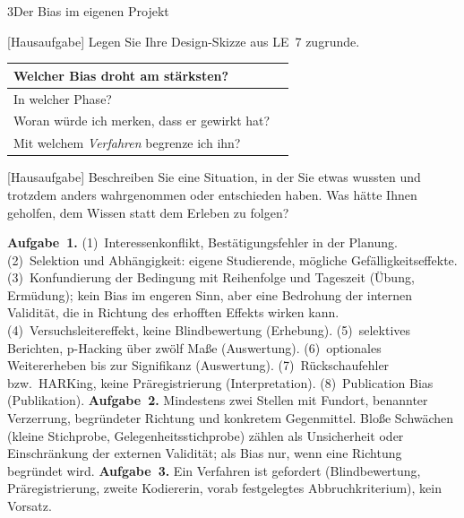 \begin{uebungsblattb}{3}{Der Bias im eigenen Projekt}

[Hausaufgabe]
Legen Sie Ihre Design-Skizze aus LE~7 zugrunde.

\begin{center}
\renewcommand{\arraystretch}{1.8}
\begin{tabular}{|p{}|p{}|}
\hline
Welcher Bias droht am stärksten? & \\ \hline
In welcher Phase? & \\ \hline
Woran würde ich merken, dass er gewirkt hat? & \\ \hline
Mit welchem \emph{Verfahren} begrenze ich ihn? & \\ \hline
\end{tabular}
\end{center}

[Hausaufgabe]
Beschreiben Sie eine Situation, in der Sie etwas wussten und trotzdem
anders wahrgenommen oder entschieden haben. Was hätte Ihnen geholfen,
dem Wissen statt dem Erleben zu folgen?

\begin{lehrhinweis}[Erwartungshorizont]
\textbf{Aufgabe~1.} (1)~Interessenkonflikt, Bestätigungsfehler in der
Planung. (2)~Selektion und Abhängigkeit: eigene Studierende, mögliche
Gefälligkeitseffekte. (3)~Konfundierung der Bedingung mit Reihenfolge und
Tageszeit (Übung, Ermüdung); kein Bias im engeren Sinn, aber eine
Bedrohung der internen Validität, die in Richtung des erhofften Effekts
wirken kann. (4)~Versuchsleitereffekt, keine Blindbewertung (Erhebung).
(5)~selektives Berichten, p-Hacking über zwölf Maße (Auswertung).
(6)~optionales Weitererheben bis zur Signifikanz (Auswertung).
(7)~Rückschaufehler bzw.\ HARKing, keine Präregistrierung
(Interpretation). (8)~Publication Bias (Publikation).
\textbf{Aufgabe~2.} Mindestens zwei Stellen mit Fundort, benannter
Verzerrung, begründeter Richtung und konkretem Gegenmittel. Bloße
Schwächen (kleine Stichprobe, Gelegenheitsstichprobe) zählen als
Unsicherheit oder Einschränkung der externen Validität; als Bias nur, wenn
eine Richtung begründet wird.
\textbf{Aufgabe~3.} Ein Verfahren ist gefordert (Blindbewertung,
Präregistrierung, zweite Kodiererin, vorab festgelegtes
Abbruchkriterium), kein Vorsatz.
\end{lehrhinweis}
\end{uebungsblattb}

